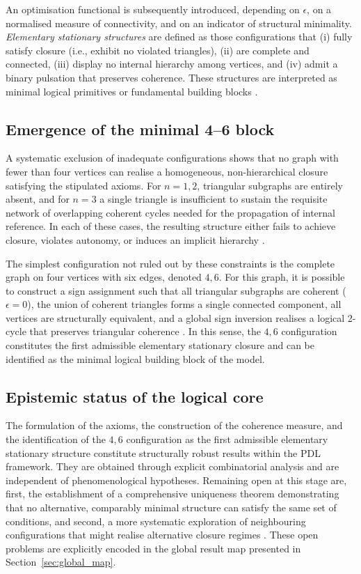 \documentclass[11pt,a4paper]{article}
\begin{document}
An optimisation functional is subsequently introduced, depending on \(\epsilon\), on a normalised measure of connectivity, and on an indicator of structural minimality. \emph{Elementary stationary structures} are defined as those configurations that (i) fully satisfy closure (i.e., exhibit no violated triangles), (ii) are complete and connected, (iii) display no internal hierarchy among vertices, and (iv) admit a binary pulsation that preserves coherence. These structures are interpreted as minimal logical primitives or fundamental building blocks \citep{PDL_Main_2026,PDL_position}.

\subsection{Emergence of the minimal 4--6 block}
\label{subsec:4_6_block}

A systematic exclusion of inadequate configurations shows that no graph with fewer than four vertices can realise a homogeneous, non-hierarchical closure satisfying the stipulated axioms. For \(n = 1,2\), triangular subgraphs are entirely absent, and for \(n = 3\) a single triangle is insufficient to sustain the requisite network of overlapping coherent cycles needed for the propagation of internal reference. In each of these cases, the resulting structure either fails to achieve closure, violates autonomy, or induces an implicit hierarchy \citep{PDL_Main_2026}.

The simplest configuration not ruled out by these constraints is the complete graph on four vertices with six edges, denoted \(4,6\). For this graph, it is possible to construct a sign assignment such that all triangular subgraphs are coherent (\(\epsilon = 0\)), the union of coherent triangles forms a single connected component, all vertices are structurally equivalent, and a global sign inversion realises a logical 2-cycle that preserves triangular coherence
\citep{PDL_Main_2026,PDL_intro}. In this sense, the \(4,6\) configuration constitutes the first admissible elementary stationary closure and can be identified as the minimal logical building block of the model.

\subsection{Epistemic status of the logical core}
\label{subsec:logical_status}

The formulation of the axioms, the construction of the coherence measure, and the identification of the \(4,6\) configuration as the first admissible elementary stationary structure constitute structurally robust results within the PDL framework. They are obtained through explicit combinatorial analysis and are independent of phenomenological hypotheses. Remaining open at this stage are, first, the establishment of a comprehensive uniqueness theorem demonstrating that no alternative, comparably minimal structure can satisfy the same set of conditions, and second, a more systematic exploration of neighbouring configurations that might realise alternative closure regimes \citep{PDL_position}. These open problems are explicitly encoded in the global result map presented in Section~\ref{sec:global_map}.
\end{document}
